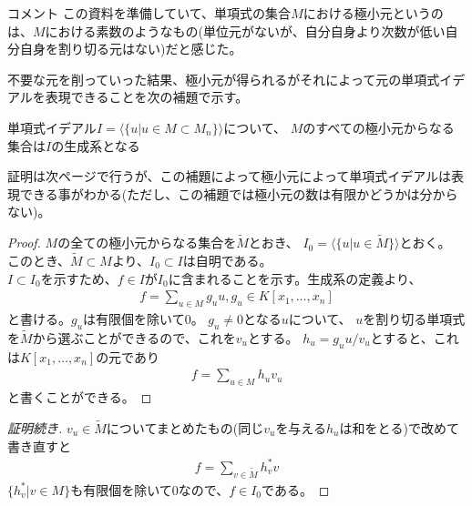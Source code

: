 \begin{frame}
	\begin{block} {コメント}
		この資料を準備していて、単項式の集合$M$における極小元というのは、$M$における素数のようなもの(単位元がないが、自分自身より次数が低い自分自身を割り切る元はない)だと感じた。
	\end{block}
	不要な元を削っていった結果、極小元が得られるがそれによって元の単項式イデアルを表現できることを次の補題で示す。
	\begin{lemma}
		\label{lem:minimal_element_generation}
		単項式イデアル$I=\langle \{ u | u \in M \subset M_n \}\rangle$について、
		$M$のすべての極小元からなる集合は$I$の生成系となる
	\end{lemma}
	証明は次ページで行うが、この補題によって極小元によって単項式イデアルは表現できる事がわかる(ただし、この補題では極小元の数は有限かどうかは分からない)。
\end{frame}

\begin{frame}
	\begin{proof}
		$M$の全ての極小元からなる集合を$\tilde{M}$とおき、
		$I_0 = \langle \{u | u \in \tilde{M} \} \rangle$とおく。
		このとき、$\tilde{M} \subset M$より、$I_0 \subset I$は自明である。\\
		$I \subset I_0$を示すため、$f \in I$が$I_0$に含まれることを示す。生成系の定義より、
		\begin{align*}
			f = \sum_{u \in M} g_u u, g_u \in K[x_1, \ldots, x_n]
		\end{align*}
		と書ける。$g_u$は有限個を除いて0。
		$g_u \neq 0$となる$u$について、
		$u$を割り切る単項式を$\tilde{M}$から選ぶことができるので、これを$v_u$とする。
		$h_u = g_u u / v_u$とすると、これは$K[x_1, \ldots, x_n]$の元であり
		\begin{align*}
			f = \sum_{u \in M} h_u v_u
		\end{align*}
		と書くことができる。
		\let\qedsymbol\relax
	\end{proof}
\end{frame}

\begin{frame}
	\begin{proof}[証明続き]
		$v_u \in \tilde{M}$についてまとめたもの(同じ$v_u$を与える$h_u$は和をとる)で改めて書き直すと
		\begin{align*}
			f = \sum_{v \in \tilde{M}} h^*_v v
		\end{align*}
		$\{h^*_v | v \in M\}$も有限個を除いて0なので、$f \in I_0$である。
	\end{proof}
\end{frame}

